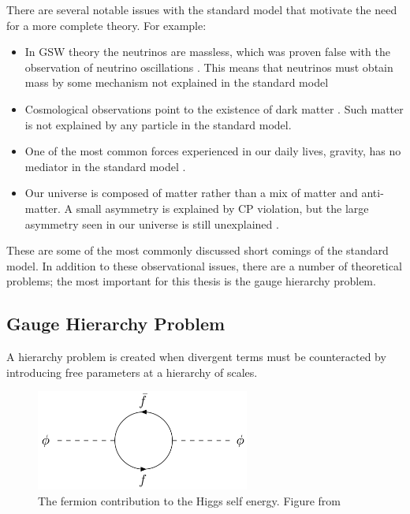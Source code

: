 There are several notable issues with the standard model that motivate the need for a more complete theory. For example:
\begin{itemize}
\item In GSW theory the neutrinos are massless, which was proven false with the observation of neutrino oscillations \cite{NeutrinoOscSNO, NeutrinoOscSupK}. This means that neutrinos must obtain mass by some mechanism not explained in the standard model
\item Cosmological observations point to the existence of dark matter \cite{Griffiths, BulletCluster, GalaxyArm}. Such matter is not explained by any particle in the standard model.
\item One of the most common forces experienced in our daily lives, gravity, has no mediator in the standard model \cite{Peskin}.
\item Our universe is composed of matter rather than a mix of matter and anti-matter. A small asymmetry is explained by CP violation, but the large asymmetry seen in our universe is still unexplained \cite{Peskin, mattAsymmetry}.
\end{itemize}
These are some of the most commonly discussed short comings of the standard model. In addition to these observational issues, there are a number of theoretical problems; the most important for this thesis is the gauge hierarchy problem.

\subsection{Gauge Hierarchy Problem}
\label{gaugeHprob}

A hierarchy problem is created when divergent terms must be counteracted by introducing free parameters at a hierarchy of scales. 

\begin{figure}[htb]
    \centering
    \includegraphics[width=7cm]{HiggsFermionSelfE.png}
    \caption{The fermion contribution to the Higgs self energy. Figure from \cite{SusyHiggsSelfE}}
    \label{HiggsSelfE}
\end{figure}

